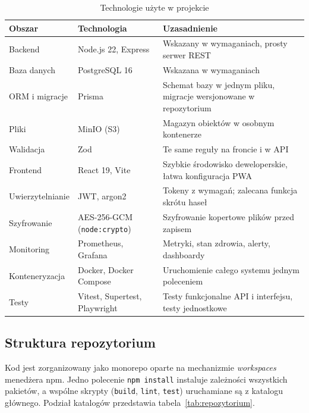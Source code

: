 \begin{table}[htbp]
\centering
\caption{Technologie użyte w projekcie}
\label{tab:technologie}
\small
\begin{tabular}{|p{}|p{}|p{}|}
\hline
\textbf{Obszar} & \textbf{Technologia} & \textbf{Uzasadnienie} \\
\hline
Backend & Node.js 22, Express & Wskazany w wymaganiach, prosty serwer REST \\
\hline
Baza danych & PostgreSQL 16 & Wskazana w wymaganiach \\
\hline
ORM i migracje & Prisma & Schemat bazy w jednym pliku, migracje wersjonowane w repozytorium \\
\hline
Pliki & MinIO (S3) & Magazyn obiektów w osobnym kontenerze \\
\hline
Walidacja & Zod & Te same reguły na froncie i w API \\
\hline
Frontend & React 19, Vite & Szybkie środowisko deweloperskie, łatwa konfiguracja PWA \\
\hline
Uwierzytelnianie & JWT, argon2 & Tokeny z wymagań; zalecana funkcja skrótu haseł \\
\hline
Szyfrowanie & AES-256-GCM (\texttt{node:crypto}) & Szyfrowanie kopertowe plików przed zapisem \\
\hline
Monitoring & Prometheus, Grafana & Metryki, stan zdrowia, alerty, dashboardy \\
\hline
Konteneryzacja & Docker, Docker Compose & Uruchomienie całego systemu jednym poleceniem \\
\hline
Testy & Vitest, Supertest, Playwright & Testy funkcjonalne API i interfejsu, testy jednostkowe \\
\hline
\end{tabular}
\par
{}
\end{table}

\subsection{Struktura repozytorium}

Kod jest zorganizowany jako monorepo oparte na mechanizmie \emph{workspaces}
menedżera npm. Jedno polecenie \texttt{npm install} instaluje zależności
wszystkich pakietów, a wspólne skrypty (\texttt{build}, \texttt{lint},
\texttt{test}) uruchamiane są z katalogu głównego. Podział katalogów
przedstawia tabela~\ref{tab:repozytorium}.

